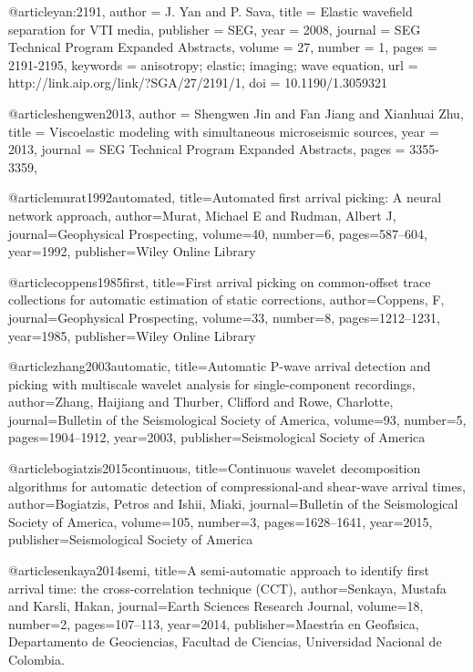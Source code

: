 @article{yan:2191,
  author =	 {J. Yan and P. Sava},
  title =	 {Elastic wavefield separation for {VTI} media},
  publisher =	 {SEG},
  year =	 2008,
  journal =	 {SEG Technical Program Expanded Abstracts},
  volume =	 27,
  number =	 1,
  pages =	 {2191-2195},
  keywords =	 {anisotropy; elastic; imaging; wave equation},
  url =		 {http://link.aip.org/link/?SGA/27/2191/1},
  doi =		 {10.1190/1.3059321}
}




@article{shengwen2013,
  author =	 {Shengwen Jin and Fan Jiang and Xianhuai Zhu},
  title =	 {Viscoelastic modeling with simultaneous microseismic sources},
  year =	 2013,
  journal =	 {SEG Technical Program Expanded Abstracts},
  pages =	 {3355-3359},
}

@article{murat1992automated,
  title={Automated first arrival picking: A neural network approach},
  author={Murat, Michael E and Rudman, Albert J},
  journal={Geophysical Prospecting},
  volume={40},
  number={6},
  pages={587--604},
  year={1992},
  publisher={Wiley Online Library}
}

@article{coppens1985first,
  title={First arrival picking on common-offset trace collections for automatic estimation of static corrections},
  author={Coppens, F},
  journal={Geophysical Prospecting},
  volume={33},
  number={8},
  pages={1212--1231},
  year={1985},
  publisher={Wiley Online Library}
}

@article{zhang2003automatic,
  title={Automatic P-wave arrival detection and picking with multiscale wavelet analysis for single-component recordings},
  author={Zhang, Haijiang and Thurber, Clifford and Rowe, Charlotte},
  journal={Bulletin of the Seismological Society of America},
  volume={93},
  number={5},
  pages={1904--1912},
  year={2003},
  publisher={Seismological Society of America}
}


@article{bogiatzis2015continuous,
  title={Continuous wavelet decomposition algorithms for automatic detection of compressional-and shear-wave arrival times},
  author={Bogiatzis, Petros and Ishii, Miaki},
  journal={Bulletin of the Seismological Society of America},
  volume={105},
  number={3},
  pages={1628--1641},
  year={2015},
  publisher={Seismological Society of America}
}

@article{senkaya2014semi,
  title={A semi-automatic approach to identify first arrival time: the cross-correlation technique (CCT)},
  author={Senkaya, Mustafa and Karsli, Hakan},
  journal={Earth Sciences Research Journal},
  volume={18},
  number={2},
  pages={107--113},
  year={2014},
  publisher={Maestr{\'\i}a en Geof{\'\i}sica, Departamento de Geociencias, Facultad de Ciencias, Universidad Nacional de Colombia.}
}

